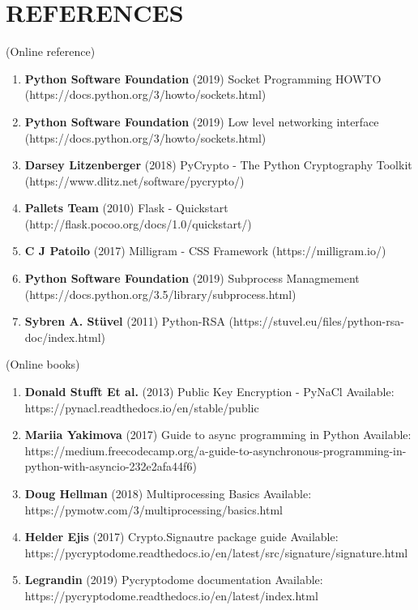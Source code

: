 \chapter*{\rm \large \bf REFERENCES}
\vspace{4.0mm}
\setlength{\parindent}{1cm} 

\scriptsize{(Online reference)}
\begin{enumerate}
    \item \textbf{Python Software Foundation} (2019) Socket Programming HOWTO
        (https://docs.python.org/3/howto/sockets.html)

    \item \textbf{Python Software Foundation} (2019) Low level networking
        interface (https://docs.python.org/3/howto/sockets.html)

    \item \textbf{Darsey Litzenberger} (2018) PyCrypto - The Python Cryptography
        Toolkit (https://www.dlitz.net/software/pycrypto/)

    \item \textbf{Pallets Team} (2010) Flask - Quickstart
        (http://flask.pocoo.org/docs/1.0/quickstart/)

    \item \textbf{C J Patoilo} (2017) Milligram - CSS Framework
        (https://milligram.io/)

    \item \textbf{Python Software Foundation} (2019) Subprocess Managmement
        (https://docs.python.org/3.5/library/subprocess.html)

    \item \textbf{Sybren A. Stüvel} (2011) Python-RSA
        (https://stuvel.eu/files/python-rsa-doc/index.html)
\end{enumerate}

\scriptsize{(Online books)}
\begin{enumerate}
    \item \textbf{Donald Stufft Et al.} (2013) Public Key Encryption - PyNaCl
        Available: https://pynacl.readthedocs.io/en/stable/public

    \item \textbf{Mariia Yakimova} (2017) Guide to async programming in Python
        Available: https://medium.freecodecamp.org/a-guide-to-asynchronous-programming-in-python-with-asyncio-232e2afa44f6)

    \item \textbf{Doug Hellman} (2018) Multiprocessing Basics
        Available: https://pymotw.com/3/multiprocessing/basics.html

    \item \textbf{Helder Ejis} (2017) Crypto.Signautre package guide
        Available: https://pycryptodome.readthedocs.io/en/latest/src/signature/signature.html

    \item \textbf{Legrandin} (2019) Pycryptodome documentation
        Available: https://pycryptodome.readthedocs.io/en/latest/index.html
\end{enumerate}

\newpage
